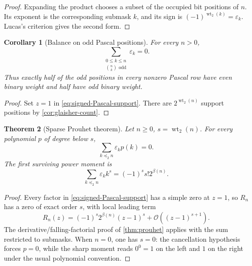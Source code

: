 \documentclass[11pt,oneside]{article}
\numberwithin{equation}{section}
\newtheorem{theorem}{Theorem}[section]
\newtheorem{corollary}[theorem]{Corollary}
\theoremstyle{definition}
\theoremstyle{remark}
\newcommand{\bigO}{\mathcal O}
\newcommand{\wt}{\operatorname{wt}_2}
\newcommand{\eps}{\varepsilon}
\newcommand{\submask}{\mathrel{\preccurlyeq_2}}
\begin{document}
\begin{proof}
Expanding the product chooses a subset of the occupied bit positions of
\(n\).  Its exponent is the corresponding submask \(k\), and its sign is
\((-1)^{\wt(k)}=\eps_k\).  Lucas's criterion gives the second form.
\end{proof}

\begin{corollary}[Balance on odd Pascal positions]
\label{cor:Pascal-support-balance}
For every \(n>0\),
\begin{equation}
  \sum_{\substack{0\le k\le n\\\binom nk\text{ odd}}}\eps_k=0.
  \label{eq:Pascal-support-balance}
\end{equation}
Thus exactly half of the odd positions in every nonzero Pascal row have even
binary weight and half have odd binary weight.
\end{corollary}

\begin{proof}
Set \(z=1\) in \eqref{eq:signed-Pascal-support}.  There are
\(2^{\wt(n)}\) support positions by \cref{cor:glaisher-count}.
\end{proof}

\begin{theorem}[Sparse Prouhet theorem]
\label{thm:sparse-Prouhet}
Let \(n\ge0\), \(s=\wt(n)\).  For every polynomial \(p\) of degree below
\(s\),
\begin{equation}
  \boxed{
  \sum_{k\submask n}\eps_kp(k)=0.}
  \label{eq:sparse-Prouhet}
\end{equation}
The first surviving power moment is
\begin{equation}
  \boxed{
  \sum_{k\submask n}\eps_kk^s
   =(-1)^ss!2^{\beta(n)}.}
  \label{eq:sparse-first-moment}
\end{equation}
\end{theorem}

\begin{proof}
Every factor in \eqref{eq:signed-Pascal-support} has a simple zero at
\(z=1\), so \(R_n\) has a zero of exact order \(s\), with local leading term
\[
 R_n(z)=(-1)^s2^{\beta(n)}(z-1)^s+\bigO((z-1)^{s+1}).
\]
The derivative/falling-factorial proof of \cref{thm:prouhet} applies with the
sum restricted to submasks.
When \(n=0\), one has \(s=0\): the cancellation hypothesis forces \(p=0\), while the sharp
moment reads \(0^0=1\) on the left and \(1\) on the right under the usual polynomial
convention.
\end{proof}
\end{document}
